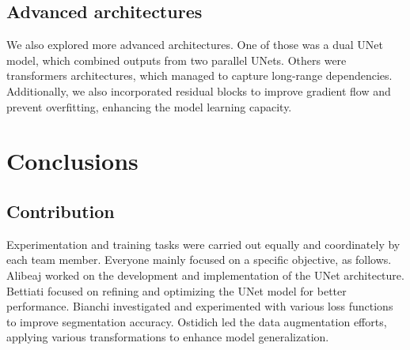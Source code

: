 \documentclass[11pt]{article}
\begin{document}
\begin{multicols}{2}
        \subsection{Advanced architectures}
        
        We also explored more advanced architectures.
        One of those was a dual UNet model, which combined outputs from two parallel UNets.
        Others were transformers architectures, which managed to capture long-range dependencies.
        Additionally, we also incorporated residual blocks to improve gradient flow and prevent overfitting, enhancing the model learning capacity.

        \section{Conclusions}
        
        \subsection{Contribution}

        Experimentation and training tasks were carried out equally and coordinately by each team member.
        Everyone mainly focused on a specific objective, as follows.
        Alibeaj worked on the development and implementation of the UNet architecture.
        Bettiati focused on refining and optimizing the UNet model for better performance.
        Bianchi investigated and experimented with various loss functions to improve segmentation accuracy.
        Ostidich led the data augmentation efforts, applying various transformations to enhance model generalization.

        
        

    \end{multicols}
\end{document}
